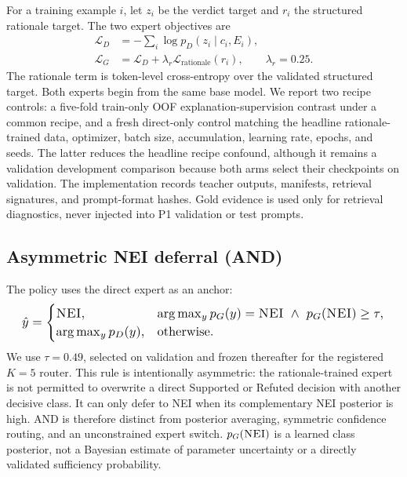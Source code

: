\documentclass[11pt]{article}
\begin{document}
For a training example $i$, let $z_i$ be the verdict target and $r_i$ the structured rationale target. The two expert objectives are
\begin{equation}
\begin{aligned}
\mathcal{L}_{D} &= -\sum_i\log p_D(z_i\mid c_i,E_i),\\
\mathcal{L}_{G} &= \mathcal{L}_{D}+\lambda_{r}\mathcal{L}_{\mathrm{rationale}}(r_i), \qquad \lambda_r=0.25.
\end{aligned}
\end{equation}
The rationale term is token-level cross-entropy over the validated structured target. Both experts begin from the same base model. We report two recipe controls: a five-fold train-only OOF explanation-supervision contrast under a common recipe, and a fresh direct-only control matching the headline rationale-trained data, optimizer, batch size, accumulation, learning rate, epochs, and seeds. The latter reduces the headline recipe confound, although it remains a validation development comparison because both arms select their checkpoints on validation. The implementation records teacher outputs, manifests, retrieval signatures, and prompt-format hashes. Gold evidence is used only for retrieval diagnostics, never injected into P1 validation or test prompts.

\subsection{Asymmetric \textsc{NEI} deferral (AND)}
The policy uses the direct expert as an anchor:
\begin{equation}
\resizebox{0.96\columnwidth}{!}{$
 \hat y = \begin{cases}
 \textsc{NEI}, & \arg\max_y p_G(y)=\textsc{NEI}\ \land\ p_G(\textsc{NEI})\ge\tau,\\
 \arg\max_y p_D(y), & \text{otherwise.}
 \end{cases}$}
\end{equation}
We use $\tau=0.49$, selected on validation and frozen thereafter for the registered $K=5$ router. This rule is intentionally asymmetric: the rationale-trained expert is not permitted to overwrite a direct Supported or Refuted decision with another decisive class. It can only defer to \textsc{NEI} when its complementary \textsc{NEI} posterior is high. AND is therefore distinct from posterior averaging, symmetric confidence routing, and an unconstrained expert switch. $p_G(\textsc{NEI})$ is a learned class posterior, not a Bayesian estimate of parameter uncertainty or a directly validated sufficiency probability.
\end{document}

